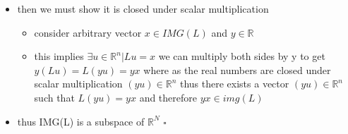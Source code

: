 \documentclass[12pt,twoside]{article}
\begin{document}
\begin{enumerate}[label=3.1]
\begin{enumerate}
{\begin{itemize}
\begin{itemize}
        \item consider arbitrary vectors $x,y\in IMG(L)$
        \item this implies $\exists u,v\in \mathbb{R}^n|Lu=x,Lv=y$ thus $Lu+Lv=L(u+v)=x+y$ where as the real numbers are closed under addition $(u+v)\in \mathbb{R}^n$ thus there exists a vector $(u+v)\in \mathbb{R}^n$ such that $L(u+v)=x+y$ and therefore $x+y\in img(L)$
        \end{itemize}
        \item then we must show it is closed under scalar multiplication
        \begin{itemize}
            \item consider arbitrary vector $x\in IMG(L)$ and $y\in \mathbb{R}$
            \item this implies $\exists u\in \mathbb{R}^n|Lu=x$ we can multiply both sides by y to get $y(Lu)=L(yu)=yx$ where as the real numbers are closed under scalar multiplication $(yu)\in \mathbb{R}^n$ thus there exists a vector $(yu)\in \mathbb{R}^n$ such that $L(yu)=yx$ and therefore $yx\in img(L)$
        \end{itemize}
        \item thus IMG(L) is a subspace of $\mathbb{R}^N$
        {\hfill$\square$}
    \end{itemize}
    }
\end{enumerate}    
    





\end{enumerate} 
\end{document}
